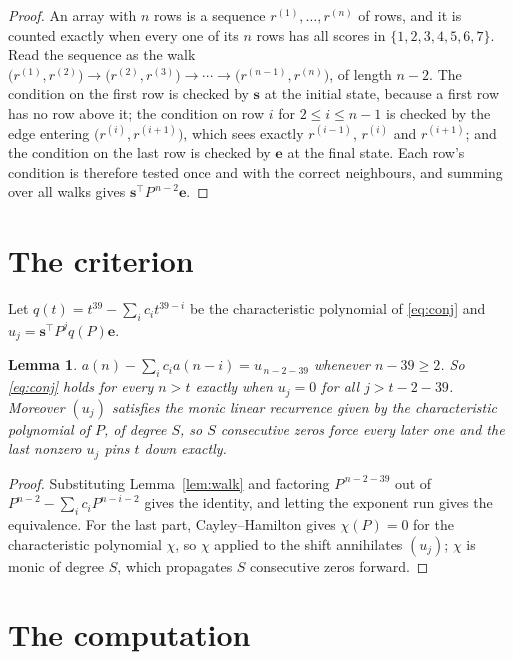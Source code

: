 \documentclass[11pt,a4paper]{article}
\theoremstyle{plain}
\newtheorem{lemma}[theorem]{Lemma}
\theoremstyle{definition}
\begin{document}
\begin{proof}
An array with $n$ rows is a sequence $r^{(1)},\dots,r^{(n)}$ of rows, and it is counted
exactly when every one of its $n$ rows has all scores in $\{1,2,3,4,5,6,7\}$. Read the sequence as the
walk $\bigl(r^{(1)},r^{(2)}\bigr)\to\bigl(r^{(2)},r^{(3)}\bigr)\to\cdots\to
\bigl(r^{(n-1)},r^{(n)}\bigr)$, of length $n-2$. The condition on the first row is
checked by $\mathbf{s}$ at the initial state, because a first row has no row above it; the
condition on row $i$ for $2\le i\le n-1$ is checked by the edge entering
$\bigl(r^{(i)},r^{(i+1)}\bigr)$, which sees exactly $r^{(i-1)}$, $r^{(i)}$ and
$r^{(i+1)}$; and the condition on the last row is checked by $\mathbf{e}$ at the final
state. Each row's condition is therefore tested once and with the correct neighbours, and
summing over all walks gives $\mathbf{s}^{\!\top}P^{\,n-2}\mathbf{e}$.
\end{proof}

\section{The criterion}

Let $q(t)=t^{39}-\sum_i c_i t^{39-i}$ be the characteristic polynomial of
\eqref{eq:conj} and $u_j=\mathbf{s}^{\!\top}P^{j}q(P)\mathbf{e}$.

\begin{lemma}\label{lem:crit}
$a(n)-\sum_i c_i a(n-i)=u_{\,n-2-39}$ whenever $n-39\ge2$. So \eqref{eq:conj}
holds for every $n>t$ exactly when $u_j=0$ for all $j>t-2-39$. Moreover $(u_j)$
satisfies the monic linear recurrence given by the characteristic polynomial of $P$, of
degree $S$, so $S$ consecutive zeros force every later one and the last nonzero $u_j$ pins
$t$ down exactly.
\end{lemma}

\begin{proof}
Substituting Lemma~\ref{lem:walk} and factoring $P^{\,n-2-39}$ out of
$P^{n-2}-\sum_i c_i P^{n-i-2}$ gives the identity, and letting the exponent run gives the
equivalence. For the last part, Cayley--Hamilton gives $\chi(P)=0$ for the characteristic
polynomial $\chi$, so $\chi$ applied to the shift annihilates $(u_j)$; $\chi$ is monic of
degree $S$, which propagates $S$ consecutive zeros forward.
\end{proof}

\section{The computation}
\end{document}
